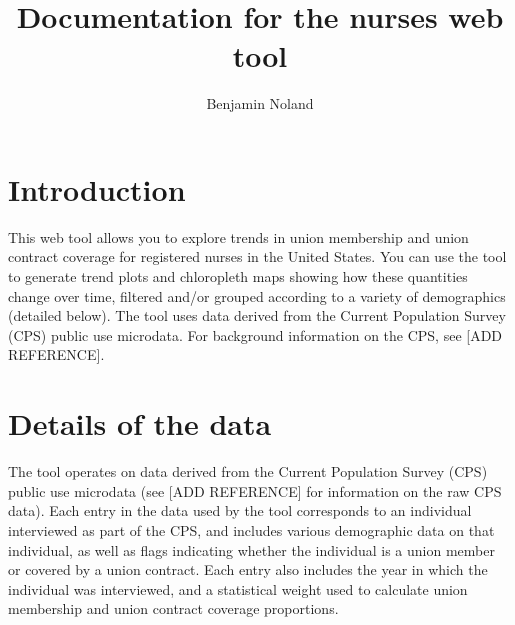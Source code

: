 \documentclass[letterpaper,12pt]{article}
\title{Documentation for the nurses web tool}
\author{Benjamin Noland}
\date{}
\begin{document}
\maketitle

\section*{Introduction}

This web tool allows you to explore trends in union membership and union
contract coverage for registered nurses in the United States. You can use the
tool to generate trend plots and chloropleth maps showing how these quantities
change over time, filtered and/or grouped according to a variety of demographics
(detailed below). The tool uses data derived from the Current Population Survey
(CPS) public use microdata. For background information on the CPS, see [ADD
REFERENCE].

\section*{Details of the data}

The tool operates on data derived from the Current Population Survey (CPS)
public use microdata (see [ADD REFERENCE] for information on the raw CPS data).
Each entry in the data used by the tool corresponds to an individual interviewed
as part of the CPS, and includes various demographic data on that individual, as
well as flags indicating whether the individual is a union member or covered by
a union contract. Each entry also includes the year in which the individual was
interviewed, and a statistical weight used to calculate union membership and
union contract coverage proportions.
\end{document}
